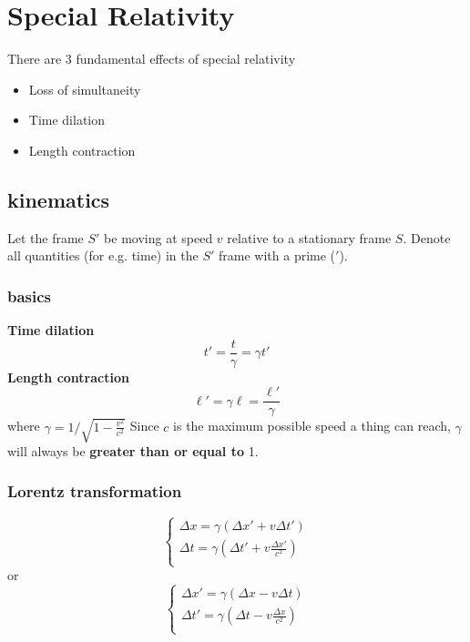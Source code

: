 \chapter{Special Relativity}
There are 3 fundamental effects of special relativity
\begin{itemize}
    \item Loss of simultaneity
    \item Time dilation
    \item Length contraction
\end{itemize}
\section{kinematics}
Let the frame $S'$ be moving at speed $v$ relative to a stationary frame $S$. Denote all quantities (for e.g. time) in the $S'$ frame with a prime ($'$).  
\subsection{basics}
\textbf{Time dilation}
\begin{equation}
    t'=\frac{t}{\gamma}=\gamma t'
\end{equation}
\textbf{Length contraction}
\begin{equation}
    \ell'=\gamma\ell = \frac{\ell'}{\gamma}
\end{equation}
where $\gamma=1/\sqrt{1-\frac{v^2}{c^2}}$
Since $c$ is the maximum possible speed a thing can reach, $\gamma$ will always be \textbf{greater than or equal to} 1. 
\subsection{Lorentz transformation}
\begin{equation}
    \begin{cases}
      \Delta x= \gamma (\Delta x' + v \Delta t') \\
      \Delta t= \gamma (\Delta t'+v \frac{\Delta x'}{c^2})\\
    \end{cases}      
\end{equation} 
or
\begin{equation}
    \begin{cases}
      \Delta x'= \gamma (\Delta x - v \Delta t) \\
      \Delta t'= \gamma (\Delta t - v \frac{\Delta x}{c^2})\\
    \end{cases}      
\end{equation} 

